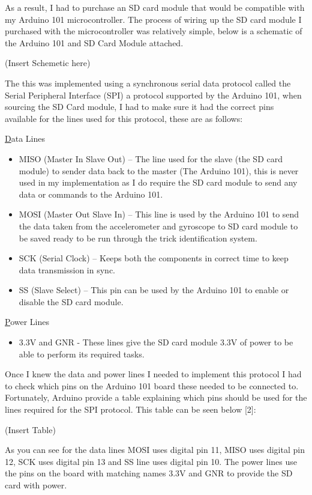As a result, I had to purchase an SD card module that would be compatible with my Arduino 101 microcontroller. The process of wiring up the SD card module I purchased with the microcontroller was relatively simple, below is a schematic of the Arduino 101 and SD Card Module attached.

(Insert Schemetic here)

The this was implemented using a synchronous serial data protocol called the Serial Peripheral Interface (SPI) a protocol supported by the Arduino 101, when sourcing the SD Card module, I had to make sure it had the correct pins available for the lines used for this protocol, these are as follows:

\underline Data Lines

\begin{itemize}
\item MISO (Master In Slave Out) – The line used for the slave (the SD card module) to sender data back to the master (The Arduino 101), this is never used in my implementation as I do require the SD card module to send any data or commands to the Arduino 101.
\item MOSI (Master Out Slave In) – This line is used by the Arduino 101 to send the data taken from the accelerometer and gyroscope to SD card module to be saved ready to be run through the trick identification system.
\item SCK (Serial Clock) – Keeps both the components in correct time to keep data transmission in sync.
\item SS (Slave Select) – This pin can be used by the Arduino 101 to enable or disable the SD card module. 
\end{itemize}

\underline Power Lines

\begin{itemize}
\item 3.3V and GNR -  These lines give the SD card module 3.3V of power to be able to perform its required tasks. 
\end{itemize}

Once I knew the data and power lines I needed to implement this protocol I had to check which pins on the Arduino 101 board these needed to be connected to. Fortunately, Arduino provide a table explaining which pins should be used for the lines required for the SPI protocol. This table can be seen below [2]:

(Insert Table)

As you can see for the data lines MOSI uses digital pin 11, MISO uses digital pin 12, SCK uses digital pin 13 and SS line uses digital pin 10. The power lines use the pins on the board with matching names 3.3V and GNR to provide the SD card with power. 

